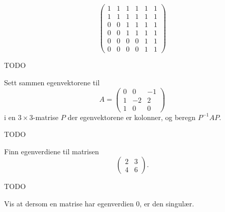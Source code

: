 \begin{oppgave}
\begin{punkt}
\[
\begin{pmatrix}
1 & 1 & 1 & 1 & 1 & 1 \\ 1 & 1 & 1 & 1 & 1 & 1\\ 0 & 0 & 1 & 1& 1 & 1 \\ 0 & 0& 1  &1 & 1 & 1 \\ 0 & 0 & 0 & 0 & 1 & 1\\ 0 & 0 & 0 & 0 & 1 & 1 
\end{pmatrix}
\]
\end{punkt}

\end{oppgave}

\begin{losning}
TODO
\end{losning}

\begin{oppgave}
Sett sammen egenvektorene til 
\[
A=
\begin{pmatrix}
0 & 0 & -1 \\ 1 & -2 & 2 \\ 1 & 0 & 0 
\end{pmatrix}
\]
i en $3 \times 3$-matrise $P$ der egenvektorene er kolonner, og beregn $P^{-1} A P$.
\end{oppgave}

\begin{losning}
TODO
\end{losning}

\begin{oppgave}
Finn egenverdiene til matrisen 
\[
\begin{pmatrix}
2 & 3  \\ 4 & 6 
\end{pmatrix}.
\]
\end{oppgave}

\begin{losning}
TODO
\end{losning}

\begin{oppgave}
Vis at dersom en matrise har egenverdien 0, er den singulær.
\end{oppgave}


